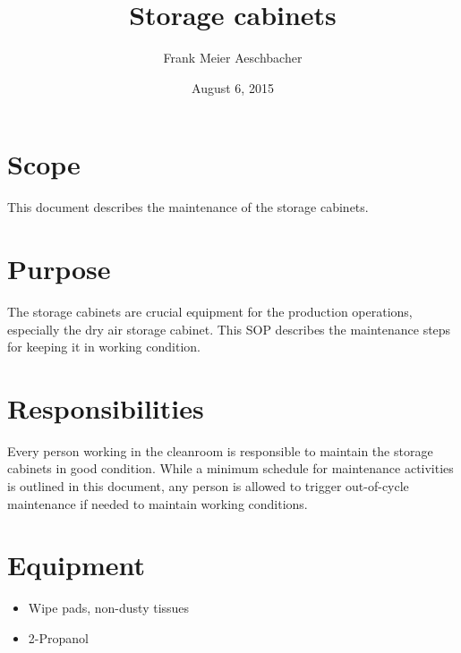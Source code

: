 \documentclass[12pt]{unlsilabsop}
\title{Storage cabinets}
\date{August 6, 2015}
\author{Frank Meier Aeschbacher}
\begin{document}
\maketitle

\section{Scope}
This document describes the maintenance of the storage cabinets.

\section{Purpose}
The storage cabinets are crucial equipment for the production operations, especially the dry air storage cabinet. This SOP describes the maintenance steps for keeping it in working condition.


\section{Responsibilities}
Every person working in the cleanroom is responsible to maintain the storage cabinets in good condition. While a minimum schedule for maintenance activities is outlined in this document, any person is allowed to trigger out-of-cycle maintenance if needed to maintain working conditions.

\section{Equipment}

\begin{itemize}
    \item Wipe pads, non-dusty tissues
    \item 2-Propanol
\end{itemize}


\end{document}
